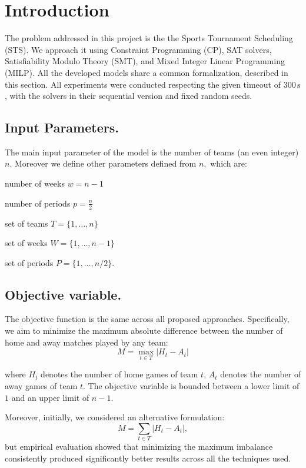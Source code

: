 \section{Introduction} \label{sec:intro}

The problem addressed in this project is the the Sports Tournament Scheduling (STS). We approach it using Constraint Programming (CP), SAT solvers, Satisfiability Modulo Theory (SMT), and Mixed Integer Linear Programming (MILP). All the developed models share a common formalization, described in this section.
All experiments were conducted respecting the given timeout of $300\,\mathrm{s}$, with the solvers in their sequential version and fixed random seeds.

\subsection{Input Parameters.}

The main input parameter of the model is the number of teams (an even integer) $n.$ Moreover we define other parameters defined from $n,$ which are: 
\begin{enumerate*}[label=(\roman*)]
    \item number of weeks $w = n-1$
    \item number of periods $p = \frac{n}{2}$  
    \item set of teams $T = \{1, \ldots, n\}$
    \item set of weeks $W =\{1,\ldots, n-1\}$
    \item set of periods $P = \{1, \ldots, n/2\}.$
\end{enumerate*}


\subsection{Objective variable.}
\label{obj_var}
The objective function is the same across all proposed approaches. Specifically, we aim to minimize the maximum absolute difference between the number of home and away matches played by any team:
\[
M = \max_{t \in T} |H_t - A_t|
\]

where \(H_t\) denotes the number of home games of team \(t\), \(A_t\) denotes the number of away games of team \(t\). The objective variable is bounded between a lower limit of $1$ and an upper limit of $n-1$.

Moreover, initially, we considered an alternative formulation: 
\[
M = \sum_{t \in T} |H_t - A_t|,
\]
but empirical evaluation showed that minimizing the maximum imbalance consistently produced significantly better results across all the techniques used.

